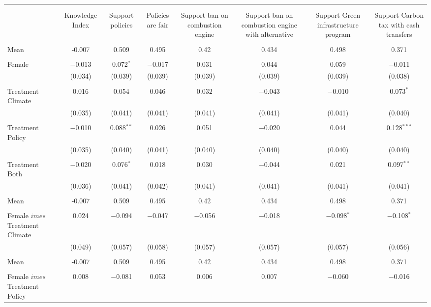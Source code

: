 
\begin{tabular}{@{\extracolsep{5pt}}lccccccc} 
\\[-1.8ex]\hline 
\hline \\[-1.8ex] 
\\[-1.8ex] & Knowledge Index & Support policies & Policies are fair & Support 
 ban on combustion engine & Support 
 ban on combustion engine with alternative & Support 
 Green infrastructure program & Support 
 Carbon tax with cash transfers \\ 
\hline \\[-1.8ex] 
 Mean & -0.007 & 0.509 & 0.495 & 0.42 & 0.434 & 0.498 & 0.371  \\ \hline \\[-1.8ex] Female & $-$0.013 & 0.072$^{*}$ & $-$0.017 & 0.031 & 0.044 & 0.059 & $-$0.011 \\ 
  & (0.034) & (0.039) & (0.039) & (0.039) & (0.039) & (0.039) & (0.038) \\ 
  & & & & & & & \\ 
 Treatment Climate & 0.016 & 0.054 & 0.046 & 0.032 & $-$0.043 & $-$0.010 & 0.073$^{*}$ \\ 
  & (0.035) & (0.041) & (0.041) & (0.041) & (0.041) & (0.041) & (0.040) \\ 
  & & & & & & & \\ 
 Treatment Policy & $-$0.010 & 0.088$^{**}$ & 0.026 & 0.051 & $-$0.020 & 0.044 & 0.128$^{***}$ \\ 
  & (0.035) & (0.040) & (0.041) & (0.040) & (0.040) & (0.040) & (0.040) \\ 
  & & & & & & & \\ 
 Treatment Both & $-$0.020 & 0.076$^{*}$ & 0.018 & 0.030 & $-$0.044 & 0.021 & 0.097$^{**}$ \\ 
  & (0.036) & (0.041) & (0.042) & (0.041) & (0.041) & (0.041) & (0.041) \\ 
  & & & & & & & \\ 
 Mean & -0.007 & 0.509 & 0.495 & 0.42 & 0.434 & 0.498 & 0.371  \\ \hline \\[-1.8ex] Female $	imes$ Treatment Climate & 0.024 & $-$0.094 & $-$0.047 & $-$0.056 & $-$0.018 & $-$0.098$^{*}$ & $-$0.108$^{*}$ \\ 
  & (0.049) & (0.057) & (0.058) & (0.057) & (0.057) & (0.057) & (0.056) \\ 
  & & & & & & & \\ 
 Mean & -0.007 & 0.509 & 0.495 & 0.42 & 0.434 & 0.498 & 0.371  \\ \hline \\[-1.8ex] Female $	imes$ Treatment Policy & 0.008 & $-$0.081 & 0.053 & 0.006 & 0.007 & $-$0.060 & $-$0.016 \\ 

\end{tabular}
